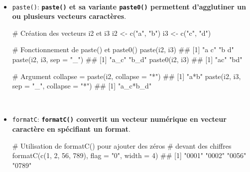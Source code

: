 \documentclass[12pt,twosided, notitlepage]{book}
\newenvironment{Shaded}{}{}
\newcommand{\KeywordTok}[1]{\textcolor[rgb]{0.00,0.00,1.00}{{#1}}}
\newcommand{\DataTypeTok}[1]{{#1}}
\newcommand{\DecValTok}[1]{{#1}}
\newcommand{\StringTok}[1]{\textcolor[rgb]{0.00,0.50,0.50}{{#1}}}
\newcommand{\CommentTok}[1]{\textcolor[rgb]{0.00,0.50,0.00}{{#1}}}
\newcommand{\NormalTok}[1]{{#1}}
\renewenvironment{Shaded}{\begin{snugshade}}{\end{snugshade}}
\begin{document}
~

\begin{itemize}
\item
  \texttt{paste()}:
  \textbf{\texttt{paste()} et sa variante \texttt{paste0()} permettent
  d'agglutiner un ou plusieurs vecteurs
  caractères}.

\begin{Shaded}
\begin{Highlighting}[]
\CommentTok{# Création des vecteurs i2 et i3}
\NormalTok{i2 <-}\StringTok{ }\KeywordTok{c}\NormalTok{(}\StringTok{"a"}\NormalTok{, }\StringTok{"b"}\NormalTok{)}
\NormalTok{i3 <-}\StringTok{ }\KeywordTok{c}\NormalTok{(}\StringTok{"c"}\NormalTok{, }\StringTok{"d"}\NormalTok{)}

\CommentTok{# Fonctionnement de paste() et paste0()}
\KeywordTok{paste}\NormalTok{(i2, i3)}
  \NormalTok{## [1] "a c" "b d"}
\KeywordTok{paste}\NormalTok{(i2, i3, }\DataTypeTok{sep =} \StringTok{"_"}\NormalTok{)}
  \NormalTok{## [1] "a_c" "b_d"}
\KeywordTok{paste0}\NormalTok{(i2, i3)}
  \NormalTok{## [1] "ac" "bd"}

\CommentTok{# Argument collapse = }
\KeywordTok{paste}\NormalTok{(i2, }\DataTypeTok{collapse =} \StringTok{"*"}\NormalTok{)}
  \NormalTok{## [1] "a*b"}
\KeywordTok{paste}\NormalTok{(i2, i3, }\DataTypeTok{sep =} \StringTok{"_"}\NormalTok{, }\DataTypeTok{collapse =} \StringTok{"*"}\NormalTok{)}
  \NormalTok{## [1] "a_c*b_d"}
\end{Highlighting}
\end{Shaded}
\end{itemize}

~

\begin{itemize}
\item
  \texttt{formatC}:
  \textbf{\texttt{formatC()} convertit un vecteur numérique en vecteur
  caractère en spécifiant un format}.

\begin{Shaded}
\begin{Highlighting}[]
\CommentTok{# Utilisation de formatC() pour ajouter des zéros}
\CommentTok{# devant des chiffres }
\KeywordTok{formatC}\NormalTok{(}\KeywordTok{c}\NormalTok{(}\DecValTok{1}\NormalTok{, }\DecValTok{2}\NormalTok{, }\DecValTok{56}\NormalTok{, }\DecValTok{789}\NormalTok{), }\DataTypeTok{flag =} \StringTok{"0"}\NormalTok{, }\DataTypeTok{width =} \DecValTok{4}\NormalTok{)}
  \NormalTok{## [1] "0001" "0002" "0056" "0789"}
\end{Highlighting}
\end{Shaded}
\end{itemize}
\end{document}
